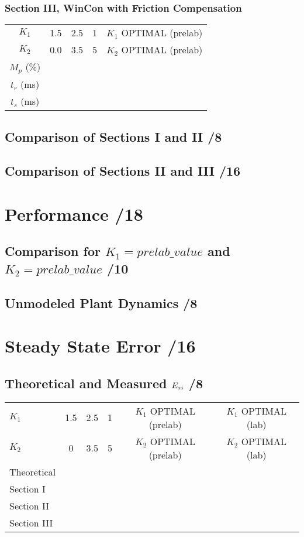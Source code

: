 \documentclass{article}
\newcommand{\score}{\hfill \underline{\hspace{1cm}}/}
\begin{document}
\subsubsection{Section III, WinCon with Friction Compensation}
\begin{center}
\begin{tabular}{crrrr}
$K_1$	&	1.5	&	2.5	&	1	& 	$K_1$ OPTIMAL (prelab)	\\
$K_2$	&	0.0	&	3.5	&	5	&	$K_2$ OPTIMAL (prelab) \\
\hline
$M_p$ (\%)	&	& & &	\\
$t_r$ (ms)	&	& & &	\\
$t_s$ (ms)	&	& & &	
\end{tabular}
\end{center}



\subsection{Comparison of Sections I and II \score 8}



\subsection{Comparison of Sections II and III \score 16}


\section{\sc Performance \score 18}
\subsection{Comparison for $K_1=prelab\_value$ and $K_2=prelab\_value$ \score 10}

\subsection{Unmodeled Plant Dynamics \score 8}


\section{\sc Steady State Error \rm \score 16}
\subsection{Theoretical and Measured $E_{\rm ss}$ \score 8}
\begin{center}
\begin{tabular}{lccccc}
$K_1$	&	1.5	&	2.5	&	1	&	$K_1$ OPTIMAL (prelab) & $K_1$ OPTIMAL (lab)	\\
$K_2$	&	0	&	3.5	&	5	&	$K_2$ OPTIMAL (prelab) & $K_2$ OPTIMAL (lab)	\\
\hline
Theoretical	&	& & & &	\\
Section I	&	& & & &	\\
Section II	&	& & & &	\\
Section III	&	& & & &	
\end{tabular}
\end{center}
\end{document}

